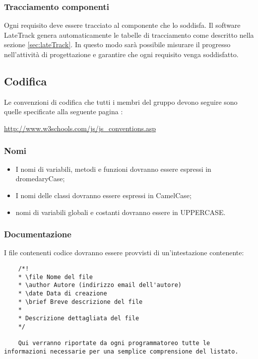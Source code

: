 	\subsubsection{Tracciamento componenti}
	Ogni requisito deve essere tracciato al componente che lo soddisfa. Il software LateTrack genera automaticamente le tabelle di tracciamento come descritto nella sezione \ref{sec:lateTrack}. In questo modo sarà possibile misurare il progresso nell'attività di progettazione e garantire che ogni requisito venga soddisfatto.
	\subsection{Codifica}
	Le convenzioni di codifica che tutti i membri del gruppo devono seguire sono quelle
	specificate alla seguente pagina :\\
	\begin{center} \url{http://www.w3schools.com/js/js_conventions.asp} \end{center}
	\subsubsection{Nomi}
	\begin{itemize}
	\item I nomi di variabili, metodi e funzioni dovranno essere espressi in dromedaryCase;
	\item I nomi delle classi dovranno essere espressi in CamelCase;
	\item nomi di variabili globali e costanti dovranno essere in UPPERCASE.
	\end{itemize}
	\subsubsection{Documentazione}
	I file contenenti codice dovranno essere provvisti di un'intestazione contenente:
	\begin{lstlisting}
    /*!
  	* \file Nome del file
  	* \author Autore (indirizzo email dell'autore)
  	* \date Data di creazione
  	* \brief Breve descrizione del file
  	*
  	* Descrizione dettagliata del file
  	*/
  	
  	Qui verranno riportate da ogni programmatoreo tutte le informazioni necessarie per una semplice comprensione del listato.
    
    \end{lstlisting}
    
